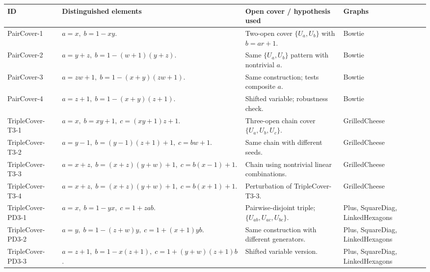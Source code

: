 \documentclass{article}
\begin{document}
\begin{table}[ht]
\centering
\footnotesize
\setlength{\extrarowheight}{0.25em}
\begin{tabularx}{\linewidth}{|l|Y|Y|Y|}
\hline
\textbf{ID} &
\textbf{Distinguished elements} &
\textbf{Open cover / hypothesis used} &
\textbf{Graphs} \\
\hline\hline

PairCover-1 &
\(a=x,\; b=1-xy\). &
Two-open cover \(\{U_a,U_b\}\) with \(b=ar+1\). &
Bowtie \\
\hline

PairCover-2 &
\(a=y+z,\; b=1-(w+1)(y+z)\). &
Same \(\{U_a,U_b\}\) pattern with nontrivial \(a\). &
Bowtie \\
\hline

PairCover-3 &
\(a=zw+1,\; b=1-(x+y)(zw+1)\). &
Same construction; tests composite \(a\). &
Bowtie \\
\hline

PairCover-4 &
\(a=z+1,\; b=1-(x+y)(z+1)\). &
Shifted variable; robustness check. &
Bowtie \\
\hline\hline

TripleCover-T3-1 &
\(a=x,\; b=xy+1,\; c=(xy+1)z+1\). &
Three-open chain cover \(\{U_a,U_b,U_c\}\). &
GrilledCheese \\
\hline

TripleCover-T3-2 &
\(a=y-1,\; b=(y-1)(z+1)+1,\; c=bw+1\). &
Same chain with different seeds. &
GrilledCheese \\
\hline

TripleCover-T3-3 &
\(a=x+z,\; b=(x+z)(y+w)+1,\; c=b(x-1)+1\). &
Chain using nontrivial linear combinations. &
GrilledCheese \\
\hline

TripleCover-T3-4 &
\(a=x+z,\; b=(x+z)(y+w)+1,\; c=b(x+1)+1\). &
Perturbation of TripleCover-T3-3. &
GrilledCheese \\
\hline\hline

TripleCover-PD3-1 &
\(a=x,\; b=1-yx,\; c=1+zab\). &
Pairwise-disjoint triple; \(\{U_{ab},U_{ac},U_{bc}\}\). &
Plus,\; SquareDiag,\; LinkedHexagons \\
\hline

TripleCover-PD3-2 &
\(a=y,\; b=1-(z+w)y,\; c=1+(x+1)yb\). &
Same construction with different generators. &
Plus,\; SquareDiag,\; LinkedHexagons \\
\hline

TripleCover-PD3-3 &
\(a=z+1,\; b=1-x(z+1),\; c=1+(y+w)(z+1)b\). &
Shifted variable version. &
Plus,\; SquareDiag,\; LinkedHexagons \\
\hline


\end{tabularx}
\end{table}
\end{document}
